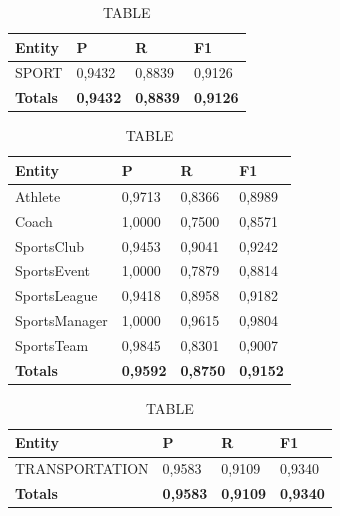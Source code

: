 \documentclass[thesis=M,english]{FITthesis}[2018/05/30]
\begin{document}

	\begin{table}[H]\centering
		\caption{TABLE}
		\label{}
		\begin{tabular}{|l|l|l|l|}
			\hline {\textbf{Entity}} & {\textbf{P}} & {\textbf{R}} & {\textbf{F1}}\\\hline
				SPORT & 0,9432 & 0,8839 & 0,9126\\\hline
				\textbf{Totals} & \textbf{0,9432} & \textbf{0,8839} & \textbf{0,9126}\\\hline
		\end{tabular}
	\end{table}

	\begin{table}[H]\centering
		\caption{TABLE}
		\label{}
		\begin{tabular}{|l|l|l|l|}
			\hline {\textbf{Entity}} & {\textbf{P}} & {\textbf{R}} & {\textbf{F1}}\\\hline
				Athlete & 0,9713 & 0,8366 & 0,8989\\
				Coach & 1,0000 & 0,7500 & 0,8571\\
				SportsClub & 0,9453 & 0,9041 & 0,9242\\
				SportsEvent & 1,0000 & 0,7879 & 0,8814\\
				SportsLeague & 0,9418 & 0,8958 & 0,9182\\
				SportsManager & 1,0000 & 0,9615 & 0,9804\\				
				SportsTeam & 0,9845 & 0,8301 & 0,9007\\\hline
				\textbf{Totals} & \textbf{0,9592} & \textbf{0,8750} & \textbf{0,9152}\\\hline
		\end{tabular}
	\end{table}	

	\begin{table}[H]\centering
		\caption{TABLE}
		\label{}
		\begin{tabular}{|l|l|l|l|}
			\hline {\textbf{Entity}} & {\textbf{P}} & {\textbf{R}} & {\textbf{F1}}\\\hline
				TRANSPORTATION & 0,9583 & 0,9109 & 0,9340\\\hline
				\textbf{Totals} & \textbf{0,9583} & \textbf{0,9109} & \textbf{0,9340}\\\hline
		\end{tabular}
	\end{table}
	
\end{document}
